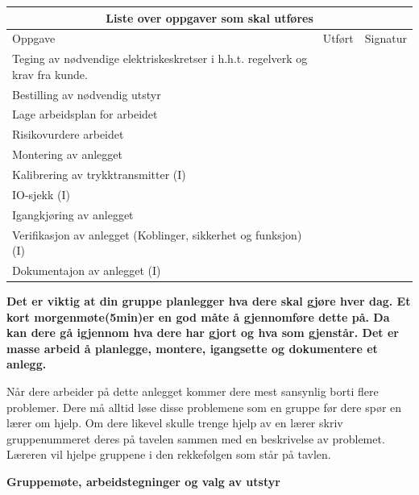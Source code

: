 \vskip 5pt

\begin{center}
\begin{tabular}{ | m{8cm} | m{1cm}| m{2cm} | } 
\hline
\multicolumn{3}{|c|}{Liste over oppgaver som skal utføres} \\
\hline
Oppgave	& Utført & Signatur \\ 
\hline
\hline
	Teging av nødvendige elektriskeskretser i h.h.t. regelverk og krav fra kunde. 	& & \\ 
	\hline
	Bestilling av nødvendig utstyr	&&\\
	\hline
	Lage arbeidsplan for arbeidet &&\\
	\hline
	Risikovurdere arbeidet&&\\
	\hline
	Montering av anlegget&&\\
	\hline
	Kalibrering av trykktransmitter (I)&&\\
	\hline
	IO-sjekk (I)&&\\
	\hline
	Igangkjøring av anlegget&&\\
	\hline
	Verifikasjon av anlegget (Koblinger, sikkerhet og funksjon) (I) &&\\
	\hline
	Dokumentajon av anlegget (I)&&\\
	\hline
\end{tabular}
\end{center}


\vskip 10pt
{\bf Det er viktig at din gruppe planlegger hva dere skal gjøre hver dag. Et kort morgenmøte(5min)er en god måte å gjennomføre dette på. Da kan dere gå igjennom hva dere har gjort og hva som gjenstår. Det er masse arbeid å planlegge, montere, igangsette og dokumentere et anlegg.}

\vskip 10pt
Når dere arbeider på dette anlegget kommer dere mest sansynlig borti flere problemer. Dere må alltid løse disse problemene som en gruppe før dere spør en lærer om hjelp. Om dere likevel skulle trenge hjelp av en lærer skriv gruppenummeret deres på tavelen sammen med en beskrivelse av problemet. Læreren vil hjelpe gruppene i den rekkefølgen som står på tavlen. 





\vfil \eject

\noindent
{\bf Gruppemøte, arbeidstegninger og valg av utstyr }

\vskip 5pt

